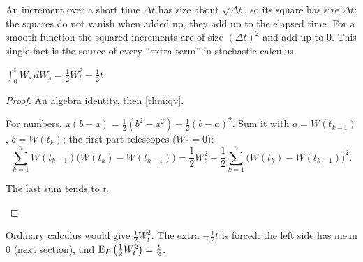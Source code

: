\begin{intuition}
An increment over a short time $\Delta t$ has size about $\sqrt{\Delta t}$, so its square has size $\Delta t$: the squares do not vanish when added up, they add up to the elapsed time. For a smooth function the squared increments are of size $(\Delta t)^2$ and add up to $0$. This single fact is the source of every ``extra term'' in stochastic calculus.
\end{intuition}

\begin{pic}
\end{pic}

\begin{theorem}[$\int W\,dW$]
\label{thm:wdw}
$\displaystyle\int_0^tW_s\,dW_s=\frac12W_t^2-\frac12t .$
\end{theorem}
\begin{proof}
An algebra identity, then \cref{thm:qv}.
\begin{steps}
  \item For numbers, $a(b-a)=\frac12(b^2-a^2)-\frac12(b-a)^2$. Sum it with $a=W(t_{k-1})$, $b=W(t_k)$; the first part telescopes ($W_0=0$):
  \[
    \sum_{k=1}^nW(t_{k-1})\big(W(t_k)-W(t_{k-1})\big)=\frac12W_t^2-\frac12\sum_{k=1}^n\big(W(t_k)-W(t_{k-1})\big)^2 .
  \]
  \item The last sum tends to $t$. \qedhere
\end{steps}
\end{proof}

Ordinary calculus would give $\frac12W_t^2$. The extra $-\frac12t$ is forced: the left side has mean $0$ (next section), and $\operatorname{E}_P\big(\frac12W_t^2\big)=\frac t2$.

